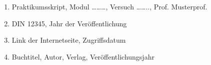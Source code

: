 


\begin{enumerate}
	\item Praktikumsskript, Modul ………, Versuch …….., Prof. Musterprof. 
	\item DIN 12345, Jahr der Veröffentlichung 
	\item Link der Internetseite, Zugriffsdatum 
	\item Buchtitel, Autor, Verlag, Veröffentlichungsjahr 
\end{enumerate}






